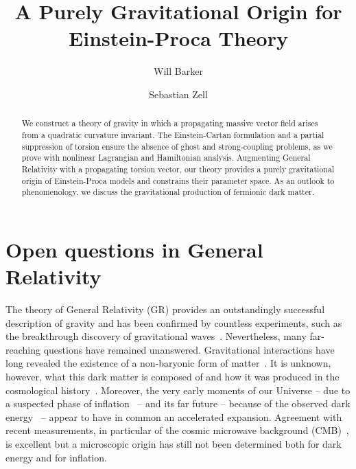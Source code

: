 \documentclass[aps,prd,reprint,preprintnumbers,showpacs,floatfix,nofootinbib,superscript address,longbibliography]{revtex4-1}
\begin{document}
\title{A Purely Gravitational Origin for Einstein-Proca Theory}

\author{Will Barker}
\author{Sebastian Zell}


\begin{abstract}
	We construct a theory of gravity in which a propagating massive vector field arises from a quadratic curvature invariant. 
	The Einstein-Cartan formulation and a partial suppression of torsion ensure the absence of ghost and strong-coupling problems, as we prove with nonlinear Lagrangian and Hamiltonian analysis. Augmenting General Relativity with a propagating torsion vector, our theory provides a purely gravitational origin of Einstein-Proca models and constrains their parameter space. As an outlook to phenomenology, we discuss the gravitational production of fermionic dark matter.
\end{abstract}



\maketitle


\section{Open questions in General Relativity}
The theory of General Relativity (GR) provides an outstandingly successful description of gravity and has been confirmed by countless experiments, such as the breakthrough discovery of gravitational waves~\cite{LIGOScientific:2016aoc}. Nevertheless, many far-reaching questions have remained unanswered. Gravitational interactions have long revealed the existence of a non-baryonic form of matter~\cite{Zwicky:1933gu}. It is unknown, however, what this dark matter is composed of and how it was produced in the cosmological history~\cite{Feng:2010gw,Peebles:2013hla,Bertone:2016nfn,Arbey:2021gdg}. Moreover, the very early moments of our Universe -- due to a suspected phase of inflation~\cite{Starobinsky:1980te, Guth:1980zm, Linde:1981mu, Mukhanov:1981xt} -- and its far future -- because of the observed dark energy~\cite{SupernovaSearchTeam:1998fmf, SupernovaCosmologyProject:1998vns} -- appear to have in common an accelerated expansion. Agreement with recent	measurements, in particular of the cosmic microwave background (CMB)~\cite{Planck:2018jri, BICEP:2021xfz}, is excellent but a microscopic origin has still not been determined both for dark energy and for inflation.
\end{document}

